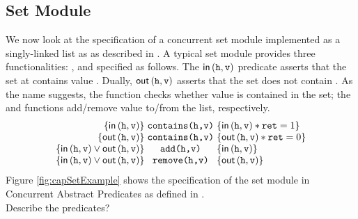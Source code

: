 \subsection{Set Module}
We now look at the specification of a concurrent set module implemented as a singly-linked list as as described in \cite{cap-ecoop10}. A typical set module provides three functionalities: ,  and  specified as follows. The $\textsf{in}\left(\texttt{h}, \texttt{v}\right) $ predicate asserts that the set at  contains value . Dually, $\textsf{out}\left(\texttt{h}, \texttt{v}\right)$ asserts that the set does not contain . As the name suggests, the  function checks whether value  is contained in the set; the  and  functions add/remove value  to/from the list, respectively. 
%
\[
\begin{array}{@{} r @{\hspace*{3pt}} c @{\hspace*{3pt}} l @{}}
	\left\{ \inSet{\var{h}}{\var{v}} \right\} & \command{contains(h,v)} & \left\{ \inSet{\var{h}}{\var{v}} * \var{ret} = 1 \right\} \\
	
	\left\{ \outSet{\var{h}}{\var{v}} \right\} & \command{contains(h,v)} & \left\{ \outSet{\var{h}}{\var{v}} * \var{ret} = 0 \right\} \\
	
	\left\{ \inSet{\var{h}}{\var{v}} \lor \outSet{\var{h}}{\var{v}}  \right\} & \command{add(h,v)} & \left\{ \inSet{\var{h}}{\var{v}} \right\}\\ 
	
	\left\{ \inSet{\var{h}}{\var{v}} \lor \outSet{\var{h}}{\var{v}}  \right\} & \command{remove(h,v)} & \left\{ \outSet{\var{h}}{\var{v}} \right\} 
\end{array}
\]
%
Figure \ref{fig:capSetExample} shows the specification of the set module in Concurrent Abstract Predicates as defined in \cite{cap-ecoop10}.\\
\todo Describe the predicates?

